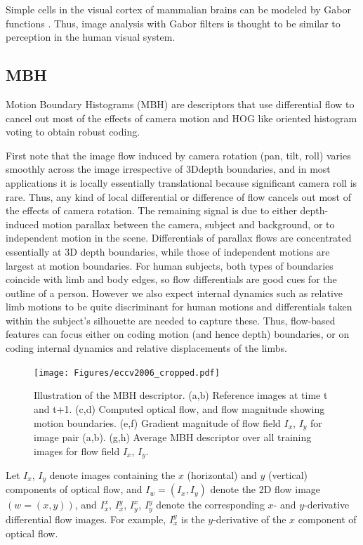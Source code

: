 Simple cells in the visual cortex of mammalian brains can be modeled by Gabor functions \cite{marvcelja1980mathematical}. Thus, image analysis with Gabor filters is thought to be similar to perception in the human visual system.

\subsection{MBH}
Motion Boundary Histograms (MBH) \cite{dalal2005histograms} are descriptors that use differential flow to cancel out most of the effects of camera motion and HOG like oriented histogram voting to obtain robust coding.

First note that the image flow induced by camera rotation (pan, tilt, roll) varies smoothly across the image irrespective of 3Ddepth boundaries, and in most applications it is locally essentially translational because significant camera roll is rare. Thus, any kind of local differential or difference of flow cancels out most of the effects of camera rotation. The remaining signal is due to either depth-induced motion parallax between the camera, subject and background, or to independent motion in the scene. Differentials
of parallax flows are concentrated essentially at 3D depth boundaries, while those of independent motions are largest at motion boundaries. For human subjects, both types of boundaries coincide with limb and body edges, so flow differentials are good cues for the outline of a person. However we also expect internal dynamics such as relative limb motions to be quite discriminant for human motions and differentials taken within the subject’s silhouette are needed to capture these. Thus, flow-based features can focus either on coding motion (and hence depth) boundaries, or on coding internal dynamics and relative displacements of the limbs.

\begin{figure}[htbp]
	\centering
		\texttt{[image: Figures/eccv2006\_cropped.pdf]}
	\caption{Illustration of the MBH descriptor. (a,b) Reference images at time t and t+1. (c,d) Computed
optical flow, and flow magnitude showing motion boundaries. (e,f) Gradient magnitude of
flow field $I_x$, $I_y$ for image pair (a,b). (g,h) Average MBH descriptor over all training images for
flow field $I_x$, $I_y$.}
\end{figure}


Let $I_x$, $I_y$ denote images containing the $x$ (horizontal) and $y$ (vertical) components of optical flow, and $I_w = (I_x, I_y)$ denote the 2D flow image $(w = (x, y))$, and $I_x^x$, $I_x^y$, $I_y^x$, $I_y^y$ denote the corresponding $x$- and $y$-derivative differential flow images. For example, $I_x^y$ is the $y$-derivative of the $x$ component of optical flow.

